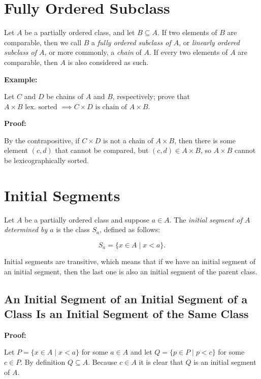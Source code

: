 \section{Fully Ordered Subclass}

Let \(A\) be a partially ordered class, and let \(B \subseteq  A\). If two elements of \(B\) are comparable,
then we call \(B\) a \emph{fully ordered subclass of \(A\)}, or \emph{linearly ordered subclass of \(A\)}, or more
commonly, a \emph{chain} of \(A\). If every two elements of \(A\) are comparable, then \(A\) is also considered as such.

\textbf{Example:}

Let \(C\) and \(D\) be chains of \(A\) and \(B\), respectively; prove that \(A \times B \text{ lex. sorted } \implies C \times D \text{ is chain of } A \times B\).

\textbf{Proof:}

By the contrapositive, if \(C \times D\) is not a chain of \(A \times B\), then there is some element \((c,d)\) that cannot be compared, but \((c,d) \in A \times B\), so \(A \times B\) cannot be lexicographically sorted.

\QED

\section{Initial Segments}

Let \(A\) be a partially ordered class and suppose \(a \in A\). The \emph{initial segment of \(A\) determined by \(a\)} is the
class \(S_a\), defined as follows:

\[
	S_a = \{x \in A \mid x < a\}.
\]

Initial segments are transitive, which means that if we have an initial segment of an initial segment, then the last one is also
an initial segment of the parent class.

\subsection*{An Initial Segment of an Initial Segment of a Class Is an Initial Segment of the Same Class}

\textbf{Proof:}

Let \(P = \{x \in A \mid x < a\}\) for some \(a \in A\) and let \(Q = \{p \in P \mid p < c\}\) for some \(c \in P\). By definition
\(Q \subseteq A\). Because \(c \in A\) it is clear that \(Q\) is an initial segment of \(A\).

\QED

